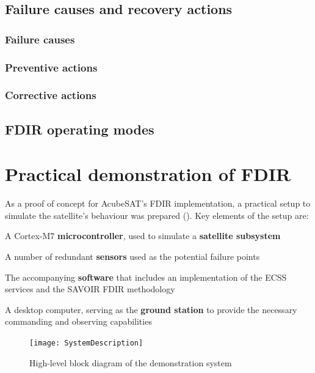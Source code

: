 \documentclass[a4paper,nobib]{tufte-book}
\begin{document}
\FloatBarrier
\section{Failure causes and recovery actions}

\subsection{Failure causes}

\subsection{Preventive actions}

\subsection{Corrective actions}

\section{\ac{FDIR} operating modes}
\label{sec:fdir_operating_modes}

\chapter{Practical demonstration of \ac{FDIR}}

As a proof of concept for AcubeSAT's \ac{FDIR} implementation, a practical setup to simulate the satellite's behaviour was prepared (). Key elements of the setup are:
\begin{compactitem}
	\item A Cortex-M7 \textbf{microcontroller}, used to simulate a \textbf{satellite subsystem}
	\item A number of redundant \textbf{sensors} used as the potential failure points
	\item The accompanying \textbf{software} that includes an implementation of the \ac{ECSS} services and the \ac{SAVOIR} \ac{FDIR} methodology
	\item A desktop computer, serving as the \textbf{ground station} to provide the necessary commanding and observing capabilities
\end{compactitem}

\begin{figure}[h]
	\texttt{[image: SystemDescription]}
	\caption{High-level block diagram of the demonstration system}
	\label{fig:block}
\end{figure}
\end{document}
